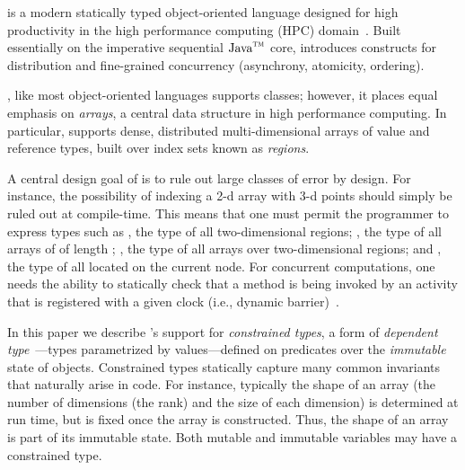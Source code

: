 
%

%
%
%

\Xten{} is a modern statically typed object-oriented
language designed for high productivity in the high performance
computing (HPC) domain~\cite{X10}. Built essentially on the
imperative sequential $\mbox{Java}^{\mbox{\scriptsize\sc tm}}$
core, \Xten{} introduces constructs for distribution and
fine-grained concurrency (asynchrony, atomicity, ordering).

\Xten{}, like most object-oriented languages supports classes;
however, it places
equal emphasis on {\em arrays}, a central data structure in high
performance computing.
In particular, \Xten{} supports dense,
distributed multi-dimensional arrays of value and reference types,
built over index sets known as {\em regions}.%

A central design goal of \Xten{} is to rule out large classes of error
by design. For instance, the possibility of indexing a 2-d array with 3-d
points should simply be ruled out at compile-time. This means that one
must permit the programmer to express types such as ,
the type of all two-dimensional regions; , the
type of all arrays of  of length ; , the type of all  arrays over two-dimensional regions; and
, the type of all  located on the
current node. For concurrent computations, one needs the ability to
statically check that a method is being invoked by an activity that is
registered with a given clock (i.e., dynamic barrier)~\cite{X10}.

In this paper we describe {\Xten}'s support for {\em
constrained types},
a form of {\em dependent
type}~\cite{dependent-types,xi99dependent,ocrz-ecoop03,aspinall-attapl,cayenne,epigram-matter,calc-constructions}---types parametrized by values---defined 
on predicates over the {\em immutable}
state of objects. Constrained types statically capture many common invariants
that naturally arise in code. For instance, typically the shape of an
array (the number of dimensions (the rank) and the size of each dimension)
is determined at
run time, but is fixed once the array is constructed. Thus, the shape of an
array is part of its immutable state.
Both mutable and immutable variables may have a constrained type.


